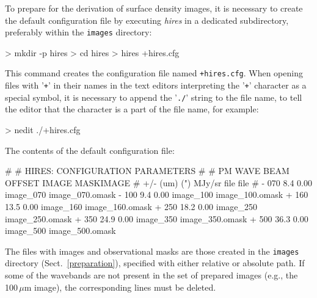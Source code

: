 \documentclass[a4paper,10pt]{article}
\begin{document}
To prepare for the derivation of surface density images, it is necessary to create the default configuration file by executing
\textsl{hires} in a dedicated subdirectory, preferably within the \verb!images! directory:
\begin{verbnobox}[\mbox{}\small]
> mkdir -p hires
> cd hires
> hires +hires.cfg
\end{verbnobox}
This command creates the configuration file named \verb!+hires.cfg!. When opening files with '\verb!+!' in their names in the text
editors interpreting the '\verb!+!' character as a special symbol, it is necessary to append the '\verb!./!' string to the file
name, to tell the editor that the character is a part of the file name, for example:
\begin{verbnobox}[\mbox{}\small]
> nedit ./+hires.cfg
\end{verbnobox}
The contents of the default configuration file:
\begin{verbnobox}[\mbox{}\small]
#
# HIRES: CONFIGURATION PARAMETERS
#
# PM  WAVE  BEAM  OFFSET  IMAGE      MASKIMAGE
# +/- (um)   (")  MJy/sr  file       file
#
   -   070   8.4   0.00   image_070  image_070.omask
   -   100   9.4   0.00   image_100  image_100.omask
   +   160  13.5   0.00   image_160  image_160.omask
   +   250  18.2   0.00   image_250  image_250.omask
   +   350  24.9   0.00   image_350  image_350.omask
   +   500  36.3   0.00   image_500  image_500.omask
\end{verbnobox}
The files with images and observational masks are those created in the \verb!images! directory (Sect.~\ref{preparation}), specified
with either relative or absolute path. If some of the wavebands are not present in the set of prepared images (e.g., the
100\,${\mu}$m image), the corresponding lines must be deleted.
\end{document}
